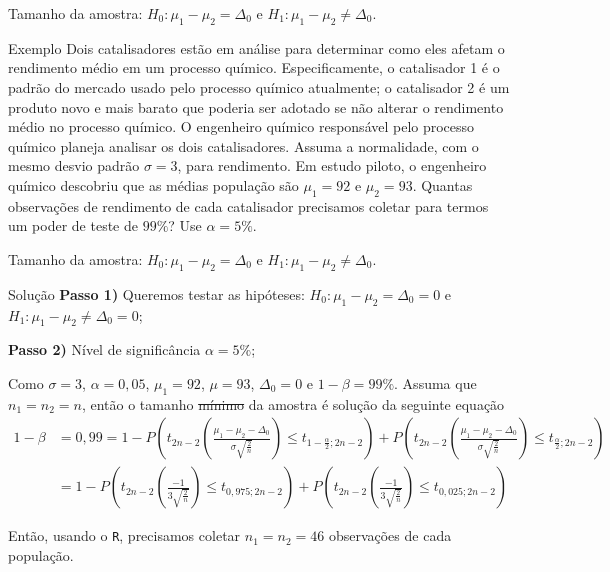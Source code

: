 \documentclass[9pt]{beamer}
\begin{document}
\begin{frame}{Tamanho da amostra: $H_0:\mu_1 - \mu_2 = \Delta_0$ e $H_1: \mu_1 - \mu_2 \neq \Delta_0$.}

\begin{block}{Exemplo}
	Dois catalisadores estão em análise para determinar como eles afetam o rendimento médio em um processo químico. Especificamente, o catalisador 1 é o padrão do mercado usado pelo processo químico atualmente; o catalisador 2 é um produto novo e mais barato que poderia ser adotado se não alterar o rendimento médio no processo químico. O engenheiro químico responsável pelo processo químico planeja analisar os dois catalisadores. Assuma a normalidade, com o mesmo desvio padrão $\sigma=3$, para rendimento. Em estudo piloto, o engenheiro químico descobriu que as médias população são $\mu_1 = 92$ e $\mu_2 = 93$.  Quantas observações de rendimento de cada catalisador precisamos coletar para termos um poder de teste de $99\%$? Use $\alpha=5\%$. 
\end{block}

\end{frame}

\begin{frame}{Tamanho da amostra: $H_0:\mu_1 - \mu_2 = \Delta_0$ e $H_1: \mu_1 - \mu_2 \neq \Delta_0$.}

\footnotesize
\begin{block}{Solução}
	\textbf{Passo 1)} Queremos testar as hipóteses: $H_0: \mu_1 - \mu_2 = \Delta_0=0$ e $H_1: \mu_1  - \mu_2 \neq \Delta_0=0$;
	
	\textbf{Passo 2)} Nível de significância $\alpha=5\%$;
		
	Como $\sigma=3$, $\alpha = 0,05$, $\mu_1=92$, $\mu=93$, $\Delta_0=0$ e $1-\beta=99\%$. Assuma que $n_1=n_2=n$, então o tamanho \sout{mínimo} da amostra é solução da seguinte equação
	\scriptsize
	\begin{align*}
		1-\beta &= 0,99 =  1 - P\left( t_{2n-2}\left( \frac{\mu_1 - \mu_2 - \Delta_0}{\sigma \sqrt{\frac{2}{n}}} \right) \leq t_{1-\frac{\alpha}{2};2n-2} \right) + P\left( t_{2n-2}\left( \frac{\mu_1 - \mu_2 - \Delta_0}{\sigma \sqrt{\frac{2}{n}}} \right) \leq t_{\frac{\alpha}{2};2n-2} \right)\\
		&= 1 - P\left( t_{2n-2}\left( \frac{-1 }{3 \sqrt{\frac{2}{n}}} \right) \leq t_{0,975;2n-2} \right) + P\left( t_{2n-2}\left( \frac{-1}{3 \sqrt{\frac{2}{n}}} \right) \leq t_{0,025;2n-2} \right)
	\end{align*}
	\normalsize
\end{block}
Então, usando o \texttt{R}, precisamos coletar $n_1=n_2=46$ observações de cada população.
\normalsize

\end{frame}
\end{document}
